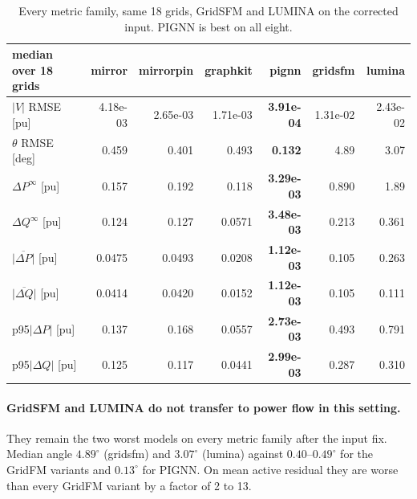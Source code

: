 \documentclass[10pt]{article}
\begin{document}
\begin{table}[H]
\centering\small
\begin{tabular}{lrrrrrr}
\toprule
median over 18 grids & mirror & mirrorpin & graphkit & pignn & gridsfm & lumina \\
\midrule
$|V|$ RMSE [pu]      & 4.18e-03 & 2.65e-03 & 1.71e-03 & \textbf{3.91e-04} & 1.31e-02 & 2.43e-02 \\
$\theta$ RMSE [deg]  & 0.459 & 0.401 & 0.493 & \textbf{0.132} & 4.89 & 3.07 \\
$\Delta P^{\infty}$ [pu]         & 0.157 & 0.192 & 0.118 & \textbf{3.29e-03} & 0.890 & 1.89 \\
$\Delta Q^{\infty}$ [pu]         & 0.124 & 0.127 & 0.0571 & \textbf{3.48e-03} & 0.213 & 0.361 \\
$\overline{|\Delta P|}$ [pu]     & 0.0475 & 0.0493 & 0.0208 & \textbf{1.12e-03} & 0.105 & 0.263 \\
$\overline{|\Delta Q|}$ [pu]     & 0.0414 & 0.0420 & 0.0152 & \textbf{1.12e-03} & 0.105 & 0.111 \\
p95$|\Delta P|$ [pu]             & 0.137 & 0.168 & 0.0557 & \textbf{2.73e-03} & 0.493 & 0.791 \\
p95$|\Delta Q|$ [pu]             & 0.125 & 0.117 & 0.0441 & \textbf{2.99e-03} & 0.287 & 0.310 \\
\bottomrule
\end{tabular}
\caption{Every metric family, same 18 grids, GridSFM and LUMINA on the corrected input. PIGNN is best on all eight.}
\end{table}

\paragraph{GridSFM and LUMINA do not transfer to power flow in this setting.}
They remain the two worst models on every metric family after the input fix.
Median angle $4.89^\circ$ (gridsfm) and $3.07^\circ$ (lumina) against
$0.40$--$0.49^\circ$ for the GridFM variants and $0.13^\circ$ for PIGNN. On mean
active residual they are worse than every GridFM variant by a factor of 2 to 13.
\end{document}
